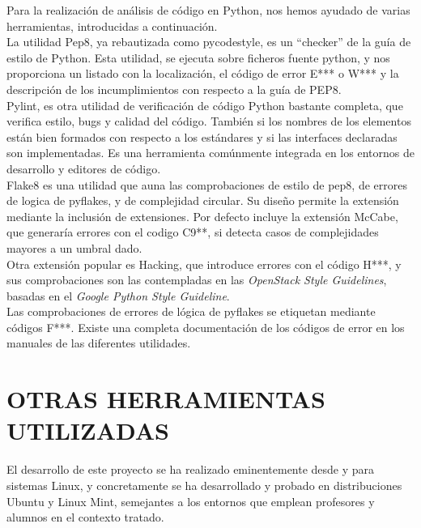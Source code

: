 Para la realización de análisis de código en Python, nos hemos ayudado de varias herramientas, introducidas a continuación.\\


La utilidad Pep8, ya rebautizada como pycodestyle, es un ``checker'' de la guía de estilo de Python. Esta utilidad, se ejecuta sobre ficheros fuente python, y nos proporciona un listado con la localización, el código de error E*** o W*** y la descripción de los incumplimientos con respecto a la guía de PEP8.\\


Pylint, es otra utilidad de verificación de código Python bastante completa, que verifica estilo, bugs y calidad del código. También si los nombres de los elementos están bien formados con respecto a los estándares y si las interfaces declaradas son implementadas. Es una herramienta comúnmente integrada en los entornos de desarrollo y editores de código.\\


Flake8 es una utilidad que auna las comprobaciones de estilo de pep8, de errores de logica de pyflakes, y de complejidad circular. Su diseño permite la extensión mediante la inclusión de extensiones.  Por defecto incluye la extensión McCabe, que generaría errores con el codigo C9**, si detecta casos de complejidades mayores a un umbral dado.\\


Otra extensión popular es Hacking, que introduce errores con el código H***, y sus comprobaciones son las contempladas en las \textit{OpenStack Style Guidelines}, basadas en el \textit{Google Python Style Guideline}.\\

Las comprobaciones de errores de lógica de pyflakes se etiquetan mediante códigos F***. Existe una completa documentación de los códigos de error en los manuales de las diferentes utilidades.\\


\section{OTRAS HERRAMIENTAS UTILIZADAS} 
\label{sec:otras_herramientas}

El desarrollo de este proyecto se ha realizado eminentemente desde y para sistemas Linux, y concretamente se ha desarrollado y probado en distribuciones Ubuntu y Linux Mint, semejantes a los entornos que emplean profesores y alumnos en el contexto tratado.

